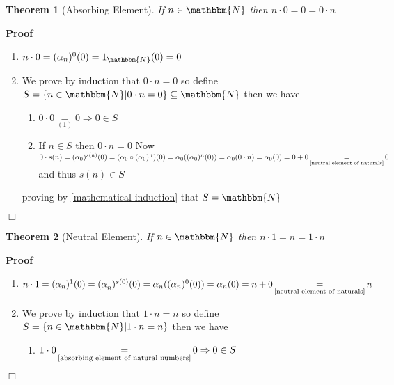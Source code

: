 \documentclass{book}
\newcommand{\equallim}{\mathop{=}\limits}
\newcommand{\nobracket}{}
\newcommand{\upl}{+}
\newenvironment{proof}{\noindent\textbf{Proof\ }}{\hspace*{\fill}$\Box$\medskip}
\newtheorem{theorem}{Theorem}
\begin{document}
{{\begin{theorem}[Absorbing Element]
  \label{absorbing element of natural numbers}If $n \in \mathbbm{N}$ then $n
  \cdot 0 = 0 = 0 \cdot n$
\end{theorem}

\begin{proof}
  
  \begin{enumerate}
    \item $n \cdot 0 = (\alpha_n)^0 (0) = 1_{\mathbbm{N}} (0) = 0$
    
    \item We prove by induction that $0 \cdot n = 0$ so define $S = \{ n \in
    \mathbbm{N} | 0 \cdot n = 0 \nobracket \} \subseteq \mathbbm{N}$ then we
    have
    \begin{enumerate}
      \item $0 \cdot 0 \equallim_{(1)} 0 \Rightarrow 0 \in S$
      
      \item If $n \in S$ then $0 \cdot n = 0$ Now $0 \cdot s (n) =
      (\alpha_0)^{s (n)} (0) = (\alpha_0 \circ (\alpha_0)^n) (0) = \alpha_0
      ((\alpha_0)^n (0)) = \alpha_0 (0 \cdot n) = \alpha_0 (0) = 0 \upl 0
      \equallim_{\text{\ref{neutral element of naturals}}} 0$ and thus $s (n)
      \in S$
    \end{enumerate}
    proving by \ref{mathematical induction} that $S =\mathbbm{N}$
  \end{enumerate}
\end{proof}

\begin{theorem}[Neutral Element]
  \label{neutral element for mulitiplication of natural numbers}If $n \in
  \mathbbm{N}$ then $n \cdot 1 = n = 1 \cdot n$
\end{theorem}

\begin{proof}
  
  \begin{enumerate}
    \item $n \cdot 1 = (\alpha_n)^1 (0) = (\alpha_n^{})^{s (0)} (0) = \alpha_n
    ((\alpha_n)^0 (0)) = \alpha_n (0) = n \upl 0 \equallim_{\text{\ref{neutral
    element of naturals}}} n$
    
    \item We prove by induction that $1 \cdot n = n$ so define $S = \{ n \in
    \mathbbm{N} | 1 \cdot n = n \nobracket \}$ then we have
    \begin{enumerate}
      \item $1 \cdot 0 \equallim_{\text{\ref{absorbing element of natural
      numbers}}} 0 \Rightarrow 0 \in S$
      

\end{enumerate}
\end{enumerate}
\end{proof}}}
\end{document}
